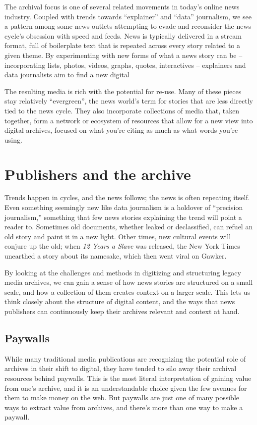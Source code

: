 The archival focus is one of several related movements in today's online news industry. Coupled with trends towards ``explainer'' and ``data'' journalism, we see a pattern among some news outlets attempting to evade and reconsider the news cycle's obsession with speed and feeds. News is typically delivered in a stream format, full of boilerplate text that is repeated across every story related to a given theme. By experimenting with new forms of what a news story can be -- incorporating lists, photos, videos, graphs, quotes, interactives -- explainers and data journalists aim to find a new digital

The resulting media is rich with the potential for re-use. Many of these pieces stay relatively ``evergreen'', the news world's term for stories that are less directly tied to the news cycle. They also incorporate collections of media that, taken together, form a network or ecosystem of resources that allow for a new view into digital archives, focused on what you're citing as much as what words you're using.

\section{Publishers and the archive}

Trends happen in cycles, and the news follows; the news is often repeating itself. Even something seemingly new like data journalism is a holdover of ``precision journalism,'' something that few news stories explaining the trend will point a reader to. Sometimes old documents, whether leaked or declassified, can refuel an old story and paint it in a new light. Other times, new cultural events will conjure up the old; when \emph{12 Years a Slave} was released, the New York Times unearthed a story about its namesake, which then went viral on Gawker.

By looking at the challenges and methods in digitizing and structuring legacy media archives, we can gain a sense of how news stories are structured on a small scale, and how a collection of them creates context on a larger scale. This lets us think closely about the structure of digital content, and the ways that news publishers can continuously keep their archives relevant and context at hand.

\subsection{Paywalls}

While many traditional media publications are recognizing the potential role of archives in their shift to digital, they have tended to silo away their archival resources behind paywalls. This is the most literal interpretation of gaining value from one's archive, and it is an understandable choice given the few avenues for them to make money on the web. But paywalls are just one of many possible ways to extract value from archives, and there's more than one way to make a paywall.

